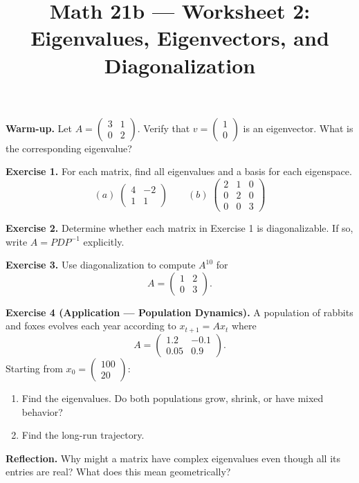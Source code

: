 \documentclass{amsart}
\title{Math 21b --- Worksheet 2: Eigenvalues, Eigenvectors, and Diagonalization}
\date{}
\begin{document}
\maketitle

\textbf{Warm-up.} Let $A = \begin{pmatrix}3&1\\0&2\end{pmatrix}$. Verify that $v = \begin{pmatrix}1\\0\end{pmatrix}$ is an eigenvector. What is the corresponding eigenvalue?

\bigskip

\textbf{Exercise 1.} For each matrix, find all eigenvalues and a basis for each eigenspace.
\[
(a)\; \begin{pmatrix}4&-2\\1&1\end{pmatrix}
\qquad
(b)\; \begin{pmatrix}2&1&0\\0&2&0\\0&0&3\end{pmatrix}
\]

\bigskip

\textbf{Exercise 2.} Determine whether each matrix in Exercise 1 is diagonalizable. If so, write $A = PDP^{-1}$ explicitly.

\bigskip

\textbf{Exercise 3.} Use diagonalization to compute $A^{10}$ for
\[
A = \begin{pmatrix}1&2\\0&3\end{pmatrix}.
\]

\bigskip

\textbf{Exercise 4 (Application --- Population Dynamics).} A population of rabbits and foxes evolves each year according to $x_{t+1} = Ax_t$ where
\[
A = \begin{pmatrix}1.2 & -0.1\\0.05 & 0.9\end{pmatrix}.
\]
Starting from $x_0 = \begin{pmatrix}100\\20\end{pmatrix}$:
\begin{enumerate}
    \item[(a)] Find the eigenvalues. Do both populations grow, shrink, or have mixed behavior?
    \item[(b)] Find the long-run trajectory.
\end{enumerate}

\bigskip

\textbf{Reflection.} Why might a matrix have complex eigenvalues even though all its entries are real? What does this mean geometrically?
\end{document}
